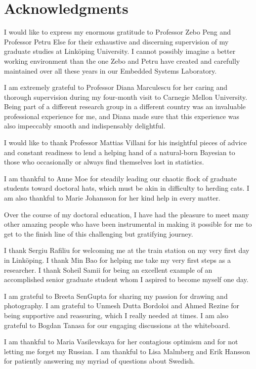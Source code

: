 \chapter*{Acknowledgments}

I would like to express my enormous gratitude to Professor Zebo Peng and
Professor Petru Else for their exhaustive and discerning supervision of my
graduate studies at Linköping University. I cannot possibly imagine a better
working environment than the one Zebo and Petru have created and carefully
maintained over all these years in our Embedded Systems Laboratory.

I am extremely grateful to Professor Diana Marculescu for her caring and
thorough supervision during my four-month visit to Carnegie Mellon University.
Being part of a different research group in a different country was an
invaluable professional experience for me, and Diana made sure that this
experience was also impeccably smooth and indispensably delightful.

I would like to thank Professor Mattias Villani for his insightful pieces of
advice and constant readiness to lend a helping hand of a natural-born Bayesian
to those who occasionally or always find themselves lost in statistics.

I am thankful to Anne Moe for steadily leading our chaotic flock of graduate
students toward doctoral hats, which must be akin in difficulty to herding cats.
I am also thankful to Marie Johansson for her kind help in every matter.

Over the course of my doctoral education, I have had the pleasure to meet many
other amazing people who have been instrumental in making it possible for me to
get to the finish line of this challenging but gratifying journey.

I thank Sergiu Rafiliu for welcoming me at the train station on my very first
day in Linköping. I thank Min Bao for helping me take my very first steps as a
researcher. I thank Soheil Samii for being an excellent example of an
accomplished senior graduate student whom I aspired to become myself one day.

I am grateful to Breeta SenGupta for sharing my passion for drawing and
photography. I am grateful to Unmesh Dutta Bordoloi and Ahmed Rezine for being
supportive and reassuring, which I really needed at times. I am also grateful to
Bogdan Tanasa for our engaging discussions at the whiteboard.

I am thankful to Maria Vasilevskaya for her contagious optimism and for not
letting me forget my Russian. I am thankful to Lisa Malmberg and Erik Hansson
for patiently answering my myriad of questions about Swedish.

